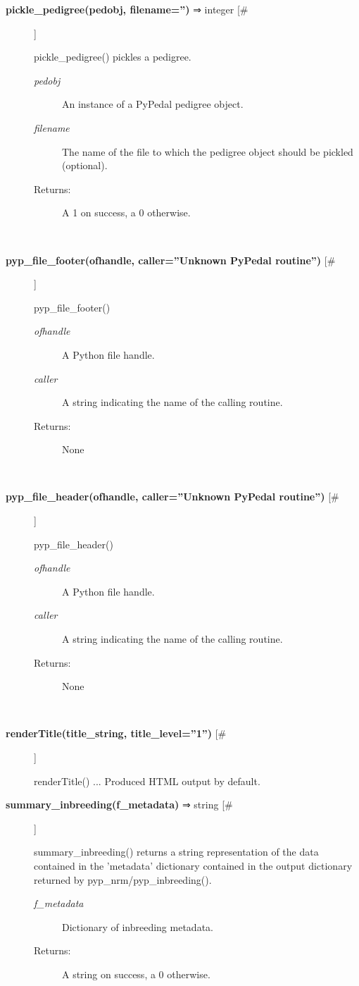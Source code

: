 \documentclass[10pt]{article}
\begin{document}
\begin{description}
\item[\textbf{pickle\_pedigree(pedobj, filename='')}
 ⇒ integer [\#]]

 pickle\_pedigree() pickles a pedigree.
\begin{description}
\item[\emph{pedobj}
] An instance of a PyPedal pedigree object.
\item[\emph{filename}
] The name of the file to which the pedigree object should be pickled (optional).
\item[Returns:] A 1 on success, a 0 otherwise.

\end{description}
\\ 

\item[\textbf{pyp\_file\_footer(ofhandle, caller=''Unknown PyPedal routine'')}
 [\#]]

 pyp\_file\_footer()
\begin{description}
\item[\emph{ofhandle}
] A Python file handle.
\item[\emph{caller}
] A string indicating the name of the calling routine.
\item[Returns:] None

\end{description}
\\ 

\item[\textbf{pyp\_file\_header(ofhandle, caller=''Unknown PyPedal routine'')}
 [\#]]

 pyp\_file\_header()
\begin{description}
\item[\emph{ofhandle}
] A Python file handle.
\item[\emph{caller}
] A string indicating the name of the calling routine.
\item[Returns:] None

\end{description}
\\ 

\item[\textbf{renderTitle(title\_string, title\_level=''1'')}
 [\#]]

 renderTitle() ... Produced HTML output by default.

\item[\textbf{summary\_inbreeding(f\_metadata)}
 ⇒ string [\#]]

 summary\_inbreeding() returns a string representation of the data contained in the 'metadata' dictionary contained in the output dictionary returned by pyp\_nrm/pyp\_inbreeding().
\begin{description}
\item[\emph{f\_metadata}
] Dictionary of inbreeding metadata.
\item[Returns:] A string on success, a 0 otherwise.


\end{description}
\end{description}
\end{document}
